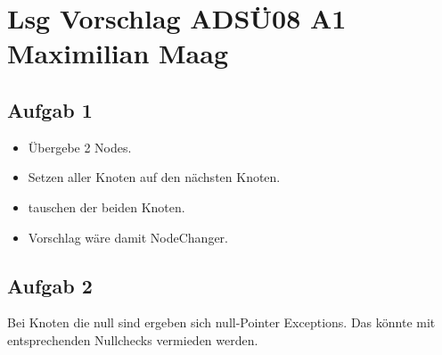 \documentclass{article}
\begin{document}
	\section*{Lsg Vorschlag ADSÜ08 A1 Maximilian Maag}
	\subsection*{Aufgab 1}
	\begin{itemize}
		\item Übergebe 2 Nodes.
		\item Setzen aller Knoten auf den nächsten Knoten.
		\item tauschen der beiden Knoten.
		\item Vorschlag wäre damit NodeChanger.
	\end{itemize}
	\subsection*{Aufgab 2}
	Bei Knoten die null sind ergeben sich null-Pointer Exceptions. Das könnte mit entsprechenden Nullchecks vermieden werden.
\end{document}
